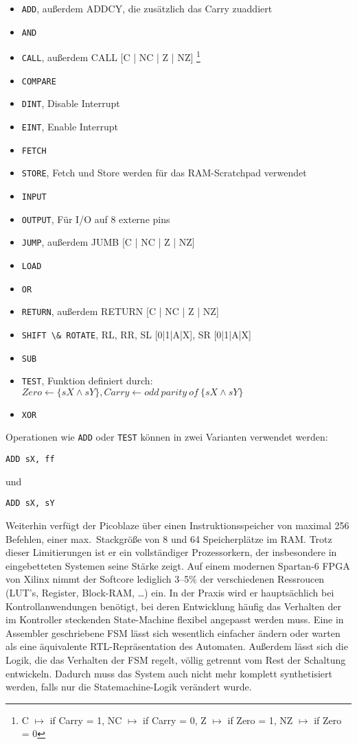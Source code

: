 \documentclass[oneside,a4paper]{article}
\def\A#1{\lstinline[style=asm]{#1}}
\begin{document}
\begin{itemize}
  \item \A{ADD}, außerdem ADDCY, die zusätzlich das Carry zuaddiert
  \item \A{AND}
  \item \A{CALL}, außerdem CALL [C | NC | Z | NZ]%
\footnote{C \(\mapsto\) if Carry = 1, NC \(\mapsto\)%
 if Carry = 0, Z \(\mapsto\) if Zero = 1, NZ \(\mapsto\) if Zero = 0}
  \item \A{COMPARE}
  \item \A{DINT}, Disable Interrupt
  \item \A{EINT}, Enable Interrupt
  \item \A{FETCH}
  \item \A{STORE}, Fetch und Store werden für das RAM-Scratchpad verwendet
  \item \A{INPUT}
  \item \A{OUTPUT}, Für I/O auf 8 externe pins
  \item \A{JUMP}, außerdem JUMB [C | NC | Z | NZ]
  \item \A{LOAD}
  \item \A{OR}
  \item \A{RETURN}, außerdem RETURN [C | NC | Z | NZ]
  \item \A{SHIFT \& ROTATE}, RL, RR, SL [0|1|A|X], SR [0|1|A|X]
  \item \A{SUB}
  \item \A{TEST}, Funktion definiert durch:
    \(Zero \gets \{sX \wedge sY\}, Carry \gets odd\ parity\ of\ \{sX \wedge sY\} \)
  \item \A{XOR}
\end{itemize}


Operationen wie \A{ADD} oder \A{TEST} können in zwei Varianten
verwendet werden:
\begin{lstlisting}[style=asm]
ADD sX, ff
\end{lstlisting}
und
\begin{lstlisting}[style=asm]
ADD sX, sY
\end{lstlisting}

Weiterhin verfügt der Picoblaze über einen Instruktionsspeicher von
maximal 256 Befehlen, einer max.\ Stackgröße von 8 und 64 Speicherplätze
im RAM. Trotz dieser Limitierungen ist er ein vollständiger
Prozessorkern, der insbesondere in eingebetteten Systemen seine
Stärke zeigt. Auf einem modernen Spartan-6 FPGA von Xilinx nimmt
der Softcore lediglich 3--5\%
der verschiedenen Ressroucen (LUT's, Register, Block-RAM, \ldots) ein.
In der Praxis wird er hauptsächlich bei Kontrollanwendungen benötigt,
bei deren Entwicklung häufig das Verhalten der im Kontroller steckenden
State-Machine flexibel angepasst werden muss.
Eine in Assembler geschriebene FSM lässt sich wesentlich
einfacher ändern oder warten als eine
äquivalente RTL-Repräsentation des Automaten.
Außerdem lässt sich die Logik, die das Verhalten der FSM regelt,
völlig getrennt vom Rest der Schaltung entwickeln. Dadurch muss
das System auch nicht mehr komplett synthetisiert werden, falls nur
die Statemachine-Logik verändert wurde.
\end{document}
